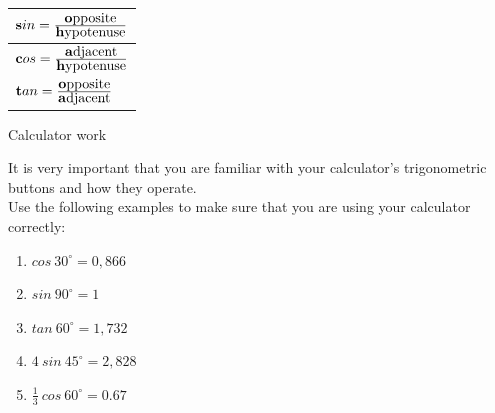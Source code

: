 \begin{table}[H]
\begin{center}
\label{m39408*id79953}
\noindent

\begin{tabular}{|l|}\hline

$\mathbf{s}in=\frac{\mbox{\textbf{o}pposite}}{\mbox{\textbf{h}ypotenuse}} $

\\  \hline

$\mathbf{c}os=\frac{\mbox{\textbf{a}djacent}}{\mbox{\textbf{h}ypotenuse}} $

\\ \hline

$\mathbf{t}an=\frac{\mbox{\textbf{o}pposite}}{\mbox{\textbf{a}djacent}} $

\\   \hline
\end{tabular}
\end{center}
\end{table}
\par


\begin{activity}{Calculator work}

It is very important that you are familiar with your calculator's trigonometric buttons and how they operate. \\
Use the following examples to make sure that you are using your calculator correctly:
\begin{enumerate}[noitemsep, label=\textbf{\arabic*}. ] 
 \item $cos~ 30^{\circ} = 0,866$
\item $sin~90^{\circ} = 1$
\item $tan~60^{\circ} = 1,732$
\item $4~sin~45^{\circ}=2,828$
\item $\frac{1}{3}~cos~60^{\circ}=0.67$
\end{enumerate}

\end{activity}

